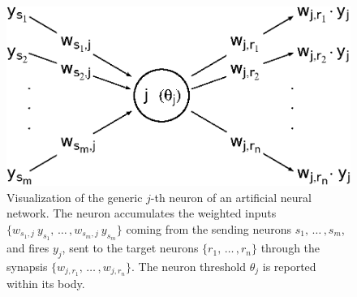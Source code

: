 \documentclass[12pt, a4paper, twoside, openright]{report}
\numberwithin{equation}{chapter}
\theoremstyle{theorem}
\theoremstyle{definition}
\theoremstyle{remark}
\theoremstyle{proposition}
\numberwithin{figure}{chapter}
\begin{document}
		\begin{figure}[t]
			\center
			\includegraphics[scale = 0.6]{neural_model_ter.eps}
			
			\caption{Visualization of the generic $j$-th neuron of an artificial neural network. The neuron accumulates the weighted inputs $\big\lbrace w_{s_1,j} ~ y_{s_1}, \, \ldots \, , w_{s_m,j} ~ y_{s_m} \big\rbrace$ coming from the sending neurons $s_1, \, \ldots \, , s_m$, and fires $y_j$, sent to the target neurons $\big\lbrace r_1, \, \ldots \, , r_n \big\rbrace$ through the synapsis $\big\lbrace w_{j,r_1}, \, \ldots \, , w_{j,r_n} \big\rbrace$. The neuron threshold $\theta_j$ is reported within its body.} 
			\label{fig:neural-model}
		\end{figure}
		
		\vspace*{0.3cm}
		
\end{document}
